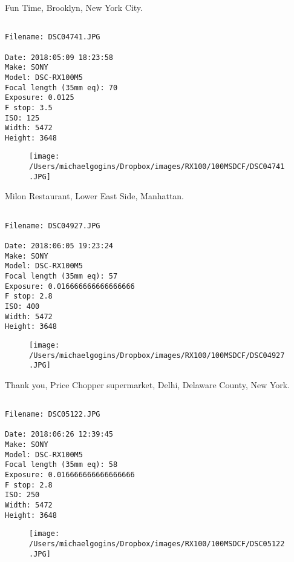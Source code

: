 \documentclass[11pt,letter,DIV=14,paper=landscape]{scrbook}
\begin{document}
\clearpage
\noindent Fun Time, Brooklyn, New York City.
\noindent
\begin{lstlisting}

Filename: DSC04741.JPG

Date: 2018:05:09 18:23:58
Make: SONY
Model: DSC-RX100M5
Focal length (35mm eq): 70
Exposure: 0.0125
F stop: 3.5
ISO: 125
Width: 5472
Height: 3648
\end{lstlisting}
\clearpage

\begin{figure}
\texttt{[image: /Users/michaelgogins/Dropbox/images/RX100/100MSDCF/DSC04741.JPG]}
\end{figure}
    
\clearpage
\noindent Milon Restaurant, Lower East Side, Manhattan.
\noindent
\begin{lstlisting}

Filename: DSC04927.JPG

Date: 2018:06:05 19:23:24
Make: SONY
Model: DSC-RX100M5
Focal length (35mm eq): 57
Exposure: 0.016666666666666666
F stop: 2.8
ISO: 400
Width: 5472
Height: 3648
\end{lstlisting}
\clearpage

\begin{figure}
\texttt{[image: /Users/michaelgogins/Dropbox/images/RX100/100MSDCF/DSC04927.JPG]}
\end{figure}
    
\clearpage
\noindent Thank you, Price Chopper supermarket, Delhi, Delaware County, New York.
\noindent
\begin{lstlisting}

Filename: DSC05122.JPG

Date: 2018:06:26 12:39:45
Make: SONY
Model: DSC-RX100M5
Focal length (35mm eq): 58
Exposure: 0.016666666666666666
F stop: 2.8
ISO: 250
Width: 5472
Height: 3648
\end{lstlisting}
\clearpage

\begin{figure}
\texttt{[image: /Users/michaelgogins/Dropbox/images/RX100/100MSDCF/DSC05122.JPG]}
\end{figure}
    
\end{document}
